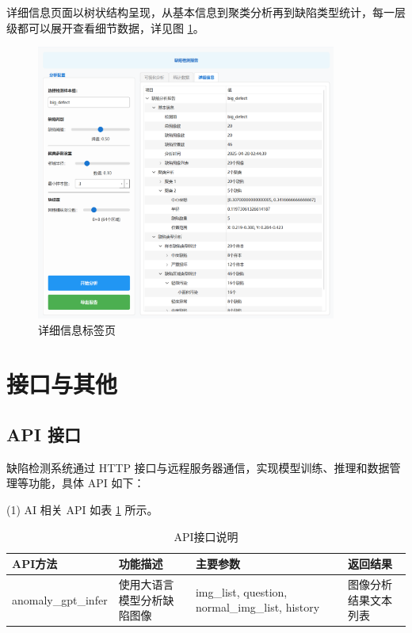 \documentclass[
  ]{njuthesis}
\begin{document}
详细信息页面以树状结构呈现，从基本信息到聚类分析再到缺陷类型统计，每一层级都可以展开查看细节数据，详见图 \ref{详细信息标签页}。

\begin{figure}[H]
    \centering
    \includegraphics[width=0.88\textwidth]{images/详细信息标签页.png}
    \caption{详细信息标签页}
    \label{详细信息标签页}
\end{figure}

\section{接口与其他}

\subsection{API 接口}

缺陷检测系统通过 HTTP 接口与远程服务器通信，实现模型训练、推理和数据管理等功能，具体 API 如下：

(1) AI 相关 API 如表 \ref{AI_API} 所示。

\begin{table}[H]
    \centering
    \caption{API接口说明}
    \label{AI_API}
    \renewcommand\arraystretch{0.5}
    \begin{tabular}{p{2.5cm}p{3.5cm}p{4cm}p{2.5cm}}
    \toprule[1.5pt]
    API方法 & 功能描述 & 主要参数 & 返回结果 \\
    \midrule[1pt]
    anomaly\_gpt\_infer & 使用大语言模型分析缺陷图像 & img\_list, question, normal\_img\_list, history & 图像分析结果文本列表 \\
    \bottomrule[1.5pt]
    \end{tabular}
\end{table}
\end{document}
